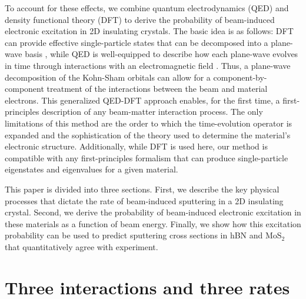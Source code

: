 \documentclass{article}
\begin{document}
To account for these effects, we combine quantum electrodynamics (QED) and
density functional theory (DFT) to derive the probability of beam-induced
electronic excitation in 2D insulating crystals.
The basic idea is as follows: DFT can provide effective single-particle states
that can be decomposed into a plane-wave basis \cite{Hohenberg1964, Kohn1965,
Kresse1996a}, while QED is well-equipped to describe how each plane-wave
evolves in time through interactions with an electromagnetic field
\cite{Lourenco-Martins2021, Peskin1995, Lancaster2014}.
Thus, a plane-wave decomposition of the Kohn-Sham orbitals can allow for a
component-by-component treatment of the interactions between the beam and
material electrons.
This generalized QED-DFT approach enables, for the first time, a
first-principles description of any beam-matter interaction process.
The only limitations of this method are the order to which the time-evolution
operator is expanded and the sophistication of the theory used to determine the
material's electronic structure.
Additionally, while DFT is used here, our method is compatible with any
first-principles formalism that can produce single-particle eigenstates and
eigenvalues for a given material.

This paper is divided into three sections.
First, we describe the key physical processes that dictate the rate of
beam-induced sputtering in a 2D insulating crystal.
Second, we derive the probability of beam-induced electronic excitation in
these materials as a function of beam energy.
Finally, we show how this excitation probability can be used to predict
sputtering cross sections in hBN and MoS$_2$ that quantitatively agree with
experiment.


\section{Three interactions and three rates}
\label{sec:bigPicture}
\end{document}
